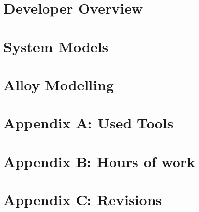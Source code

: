\documentclass[openright]{report}
\begin{document}
	\chapter{Developer Overview}
		
	\chapter{System Models}
		
	\chapter{Alloy Modelling}
		




    \appendix
    \newpage
    \chapter{Appendix A: Used Tools}
	    

	\newpage
	\chapter{Appendix B: Hours of work}
	    

	\newpage
	\chapter{Appendix C: Revisions}
	    

	
	\glsaddall
	\printglossaries

	\newpage
	\begin{thebibliography}{10}
		
	\end{thebibliography}
\end{document}

